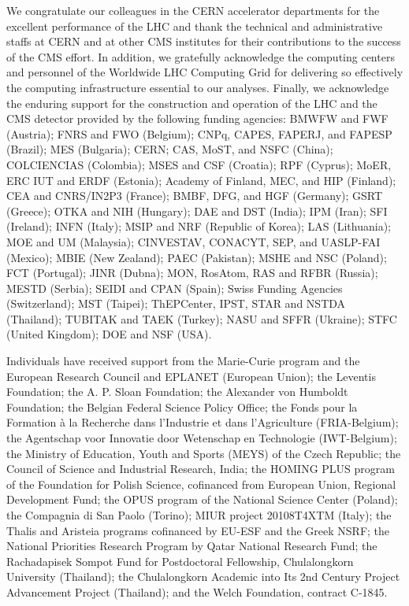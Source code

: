 \begin{frontmatter}
\begin{acknowledgements}                                                       
We congratulate our colleagues in the CERN accelerator departments for the excellent performance of the LHC and thank the technical
and administrative staffs at CERN and at other CMS institutes for their contributions to the success of
 the CMS effort. In addition, we gratefully acknowledge the computing centers and personnel of the
Worldwide LHC Computing Grid for delivering so effectively the computing infrastructure essential to our analyses. Finally, we acknowledge
the enduring support for the construction and operation of the LHC and the CMS detector provided by the following funding agencies:
BMWFW and FWF (Austria); FNRS and FWO (Belgium); CNPq, CAPES, FAPERJ, and FAPESP (Brazil); MES (Bulgaria);
CERN; CAS, MoST, and NSFC (China); COLCIENCIAS (Colombia); MSES and CSF (Croatia); RPF (Cyprus); MoER, ERC IUT and ERDF (Estonia);
Academy of Finland, MEC, and HIP (Finland); CEA and CNRS/IN2P3 (France); BMBF, DFG, and HGF (Germany); GSRT (Greece); OTKA and
NIH (Hungary); DAE and DST (India); IPM (Iran); SFI (Ireland); INFN (Italy); MSIP and NRF (Republic of Korea); LAS (Lithuania);
MOE and UM (Malaysia); CINVESTAV, CONACYT, SEP, and UASLP-FAI (Mexico); MBIE
(New Zealand); PAEC (Pakistan); MSHE and NSC (Poland); FCT (Portugal); JINR (Dubna); MON, RosAtom, RAS and RFBR (Russia); MESTD (Serbia);
SEIDI and CPAN (Spain); Swiss Funding Agencies (Switzerland); MST (Taipei); ThEPCenter, IPST, STAR and NSTDA (Thailand);
TUBITAK and TAEK (Turkey); NASU and SFFR (Ukraine); STFC (United Kingdom); DOE and NSF (USA).

Individuals have received support from the Marie-Curie program and the European Research Council and EPLANET (European Union);
the Leventis Foundation; the A. P. Sloan Foundation; the Alexander von Humboldt Foundation; the Belgian Federal Science
Policy Office; the Fonds pour la Formation \`a la Recherche dans l'Industrie et dans l'Agriculture (FRIA-Belgium); the Agentschap
voor Innovatie door Wetenschap en Technologie (IWT-Belgium); the Ministry of Education, Youth and Sports (MEYS) of the Czech Republic;
the Council of Science and Industrial Research, India; the HOMING PLUS program of the Foundation for Polish Science, cofinanced from
European Union, Regional Development Fund; the OPUS program of the National Science Center (Poland); the Compagnia di San Paolo (Torino);
MIUR project 20108T4XTM (Italy); the Thalis and Aristeia programs cofinanced by EU-ESF and the Greek NSRF; the National Priorities
Research Program by Qatar National Research Fund; the Rachadapisek Sompot Fund for Postdoctoral Fellowship, Chulalongkorn
University (Thailand); the Chulalongkorn Academic into Its 2nd Century Project Advancement Project (Thailand); and the Welch Foundation,
contract C-1845.


\end{acknowledgements}
\end{frontmatter}
